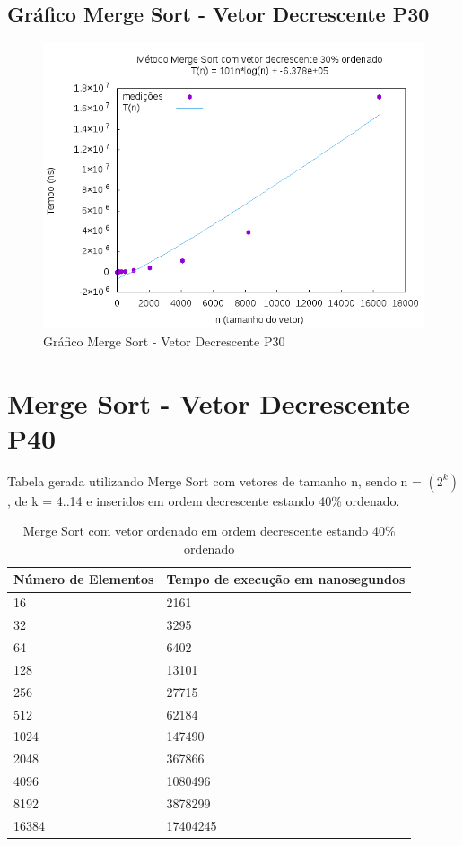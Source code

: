 \documentclass[12pt,a4paper,twoside]{report}
\begin{document}
\subsection{Gráfico Merge Sort - Vetor Decrescente P30}
\begin{figure}[H]
    \centering
    \includegraphics[width=0.7\linewidth]{graficos/MergeSort/vIntDecrescenteP30/vIntDecrescenteP30.png}
  \caption{Gráfico Merge Sort - Vetor Decrescente P30}
\end{figure}

\section{Merge Sort - Vetor Decrescente P40}
Tabela gerada utilizando Merge Sort com vetores de tamanho n, sendo n = $(2^k)$, de k = 4..14 e inseridos em ordem decrescente estando 40\% ordenado.
\begin{table}[H]
\centering
\caption{Merge Sort com vetor ordenado em ordem decrescente estando 40\% ordenado}
\label{my-label}
\begin{tabular}{|l|l|}
\hline
\multicolumn{1}{|c|}{\textbf{Número de Elementos}} & \multicolumn{1}{c|}{\textbf{Tempo de execução em nanosegundos}} \\ \hline
16 & 2161 \\ \hline
32 & 3295 \\ \hline
64 & 6402 \\ \hline
128 & 13101 \\ \hline
256 & 27715 \\ \hline
512 & 62184 \\ \hline
1024 & 147490 \\ \hline
2048 & 367866 \\ \hline
4096 & 1080496 \\ \hline
8192 & 3878299 \\ \hline
16384 & 17404245 \\ \hline
\end{tabular}
\end{table}
\end{document}

